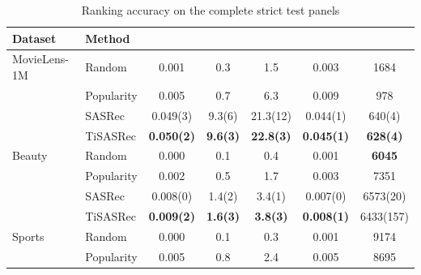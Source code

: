 \begin{table}[!htbp]
\centering
\caption{Ranking accuracy on the complete strict test panels}
\label{tab:accuracy}
\fontsize{8.5}{11}\selectfont
\setlength{\tabcolsep}{2.5pt}
\renewcommand{\arraystretch}{1.12}
\par\smallskip\noindent{}\par\smallskip
\noindent\begin{tabular*}{\textwidth}{@{\extracolsep{\fill}}llS[table-format=1.3(3)]S[table-format=2.1(3)]S[table-format=2.1(3)]S[table-format=1.3(3)]S[table-format=5.0(5)]@{}}
\toprule
Dataset & Method & {} & {} & {} & {} & {}\\
\midrule
MovieLens-1M & Random & 0.001 & 0.3 & 1.5 & 0.003 & 1684\\ %
 & Popularity & 0.005 & 0.7 & 6.3 & 0.009 & 978\\ %
 & SASRec & 0.049(3) & 9.3(6) & 21.3(12) & 0.044(1) & 640(4)\\ %
 & TiSASRec & \bfseries 0.050(2) & \bfseries 9.6(3) & \bfseries 22.8(3) & \bfseries 0.045(1) & \bfseries 628(4)\\ %
\midrule
Beauty & Random & 0.000 & 0.1 & 0.4 & 0.001 & \bfseries 6045\\ %
 & Popularity & 0.002 & 0.5 & 1.7 & 0.003 & 7351\\ %
 & SASRec & 0.008(0) & 1.4(2) & 3.4(1) & 0.007(0) & 6573(20)\\ %
 & TiSASRec & \bfseries 0.009(2) & \bfseries 1.6(3) & \bfseries 3.8(3) & \bfseries 0.008(1) & 6433(157)\\ %
\midrule
Sports & Random & 0.000 & 0.1 & 0.3 & 0.001 & 9174\\ %
 & Popularity & 0.005 & 0.8 & 2.4 & 0.005 & 8695\\ %

\end{tabular*}
\end{table}
